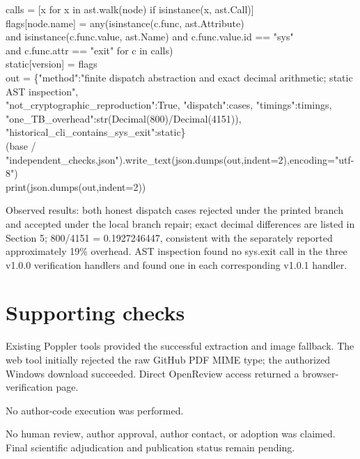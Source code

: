 \documentclass[10pt]{article}
\begin{document}
{            calls = [x for x in ast.walk(node) if isinstance(x, ast.Call)]\\
            flags[node.name] = any(isinstance(c.func, ast.Attribute)\\
               and isinstance(c.func.value, ast.Name) and c.func.value.id == "sys"\\
               and c.func.attr == "exit" for c in calls)\\
    static[version] = flags\\
out = \{"method":"finite dispatch abstraction and exact decimal arithmetic; static AST inspection",\\
       "not\_cryptographic\_reproduction":True, "dispatch":cases, "timings":timings,\\
       "one\_TB\_overhead":str(Decimal(800)/Decimal(4151)),\\
       "historical\_cli\_contains\_sys\_exit":static\}\\
(base / "independent\_checks.json").write\_text(json.dumps(out,indent=2),encoding="utf-8")\\
print(json.dumps(out,indent=2))}\par
Observed results: both honest dispatch cases rejected under the printed branch and accepted under the local branch repair; exact decimal differences are listed in Section 5; 800/4151 = 0.1927246447, consistent with the separately reported approximately 19\% overhead. AST inspection found no sys.exit call in the three v1.0.0 verification handlers and found one in each corresponding v1.0.1 handler.\par
\section*{Supporting checks}
Existing Poppler tools provided the successful extraction and image fallback. The web tool initially rejected the raw GitHub PDF MIME type; the authorized Windows download succeeded. Direct OpenReview access returned a browser-verification page.\par
No author-code execution was performed.\par
No human review, author approval, author contact, or adoption was claimed. Final scientific adjudication and publication status remain pending.\par
\end{document}
